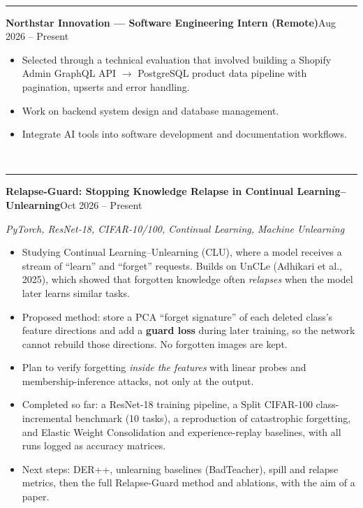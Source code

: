 \documentclass[10pt,a4paper]{article}
\renewcommand{\section}[1]{\vspace{6pt}{\large\bfseries\MakeUppercase{#1}}\\[-7pt]\rule{\textwidth}{0.6pt}\vspace{2pt}}
\newcommand{\entry}[2]{\par\textbf{#1}\hfill #2\par}
\newenvironment{points}{\vspace{-4pt}\begin{itemize}\setlength{\itemsep}{0pt}\setlength{\parskip}{0pt}\setlength{\topsep}{0pt}\setlength{\partopsep}{0pt}\setlength{\leftmargin}{12pt}}{\end{itemize}\vspace{-2pt}}
\begin{document}
\section{Experience}
\entry{Northstar Innovation --- Software Engineering Intern (Remote)}{Aug 2026 -- Present}
\begin{points}
  \item Selected through a technical evaluation that involved building a Shopify Admin GraphQL API $\rightarrow$ PostgreSQL product data pipeline with pagination, upserts and error handling.
  \item Work on backend system design and database management.
  \item Integrate AI tools into software development and documentation workflows.
\end{points}

\section{Research (Ongoing)}
\entry{Relapse-Guard: Stopping Knowledge Relapse in Continual Learning--Unlearning}{Oct 2026 -- Present}
\textit{PyTorch, ResNet-18, CIFAR-10/100, Continual Learning, Machine Unlearning}\par
\begin{points}
  \item Studying Continual Learning--Unlearning (CLU), where a model receives a stream of ``learn'' and ``forget'' requests. Builds on UnCLe (Adhikari et al., 2025), which showed that forgotten knowledge often \emph{relapses} when the model later learns similar tasks.
  \item Proposed method: store a PCA ``forget signature'' of each deleted class's feature directions and add a \textbf{guard loss} during later training, so the network cannot rebuild those directions. No forgotten images are kept.
  \item Plan to verify forgetting \emph{inside the features} with linear probes and membership-inference attacks, not only at the output.
  \item Completed so far: a ResNet-18 training pipeline, a Split CIFAR-100 class-incremental benchmark (10 tasks), a reproduction of catastrophic forgetting, and Elastic Weight Consolidation and experience-replay baselines, with all runs logged as accuracy matrices.
  \item Next steps: DER++, unlearning baselines (BadTeacher), spill and relapse metrics, then the full Relapse-Guard method and ablations, with the aim of a paper.
\end{points}
\end{document}
